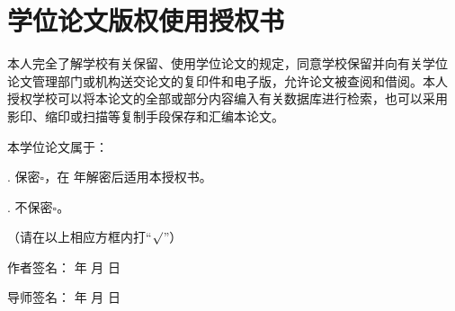 \vspace{3cm}

\section*{\centering\heiti\fontsize{18pt}{27pt}\selectfont 学位论文版权使用授权书}
\fontsize{12pt}{18pt}\selectfont
本人完全了解学校有关保留、使用学位论文的规定，同意学校保留并向有关学位
论文管理部门或机构送交论文的复印件和电子版，允许论文被查阅和借阅。本人
授权学校可以将本论文的全部或部分内容编入有关数据库进行检索，也可以采用
影印、缩印或扫描等复制手段保存和汇编本论文。

\vspace{1cm}

\noindent 本学位论文属于：\par
{}. 保密$\square$，在 \;\;\;\; 年解密后适用本授权书。\par
{}. 不保密$\square$。\par
\indent （请在以上相应方框内打“$\surd$”）

\vspace{1cm}

\begin{flushright}
    作者签名：\hspace{9ex} 年\hspace{3ex} 月\hspace{4ex} 日

    导师签名：\hspace{9ex} 年\hspace{3ex} 月\hspace{4ex} 日
\end{flushright}
